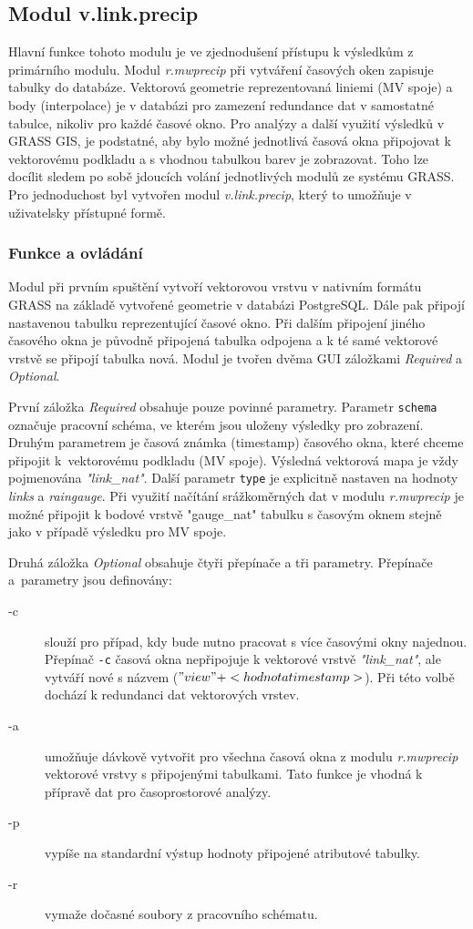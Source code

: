 \documentclass[a4paper,12pt,oneside]{report}
\begin{document}
\subsection{Modul v.link.precip}
Hlavní funkce  tohoto modulu je ve  zjednodušení přístupu k
výsledkům z primárního modulu. Modul \textit{r.mwprecip} při vytváření
časových oken zapisuje tabulky do databáze. Vektorová geometrie
reprezentovaná liniemi (MV spoje) a body (interpolace) je v databázi
pro zamezení redundance dat v samostatné tabulce, nikoliv pro každé
časové okno. Pro analýzy a další využití výsledků v GRASS GIS, je
podstatné, aby bylo možné jednotlivá časová okna připojovat k
vektorovému podkladu a s vhodnou tabulkou barev je zobrazovat.  Toho
lze docílit sledem po sobě jdoucích volání jednotlivých modulů ze systému
GRASS. Pro jednoduchost byl vytvořen modul \textit{v.link.precip},
který to umožňuje v uživatelsky přístupné formě.


\subsubsection{Funkce a ovládání}
Modul při prvním spuštění vytvoří vektorovou vrstvu v nativním
formátu GRASS na základě vytvořené geometrie v databázi
PostgreSQL. Dále pak připojí nastavenou tabulku reprezentující časové
okno. Při dalším připojení jiného časového okna je původně připojená
tabulka odpojena a k té samé vektorové vrstvě se připojí tabulka nová. Modul
je tvořen dvěma GUI záložkami \textit{Required} a \textit{Optional}.

První záložka \textit{Required} obsahuje pouze povinné parametry.
Parametr \texttt{schema} označuje pracovní schéma, ve kterém jsou
uloženy výsledky pro zobrazení. Druhým parametrem je časová známka
(timestamp) časového okna, které chceme připojit k~vektorovému
podkladu (MV spoje). Výsledná vektorová mapa je vždy pojmenována
\textit{"link\_nat"}. Další parametr \texttt{type} je explicitně
nastaven na hodnoty \emph{links} a \emph{raingauge}. Při využití
načítání srážkoměrných dat v modulu \textit{r.mwprecip} je možné
připojit k bodové vrstvě "gauge\_nat" tabulku s časovým oknem stejně
jako v případě výsledku pro MV spoje.

Druhá záložka \textit{Optional} obsahuje čtyři přepínače a tři
parametry.  Přepínače a~parametry jsou definovány:
\begin{description}
\item[-c] slouží pro případ, kdy bude nutno pracovat s více časovými
  okny najednou. Přepínač \texttt{-c} časová okna nepřipojuje k
  vektorové vrstvě \textit{"link\_nat"}, ale vytváří nové s názvem
  ($"view" + <hodnota timestamp>$). Při této volbě dochází k
  redundanci dat vektorových vrstev.
\item[-a] umožňuje dávkově vytvořit pro všechna časová okna z modulu
  \textit{r.mwprecip} vektorové vrstvy s připojenými tabulkami. Tato
  funkce je vhodná k přípravě dat pro časoprostorové analýzy.
\item[-p] vypíše na standardní výstup hodnoty připojené atributové
  tabulky.
\item[-r] vymaže dočasné soubory z pracovního schématu.
\end{description}
\end{document}

